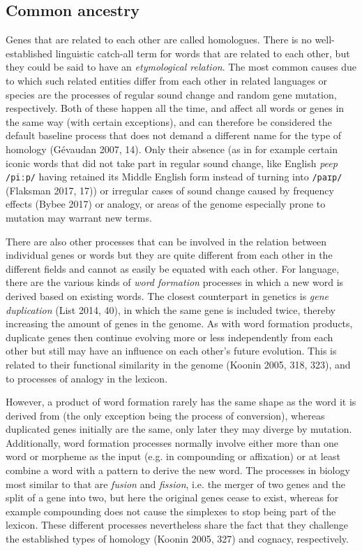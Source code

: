 \documentclass[
  a4paper,
  14pt,
  oneside,
  tablecaptionabove
]{scrbook}
\begin{document}
\subsection*{Common ancestry}

Genes that are related to each other are called homologues. There is no
well-established linguistic catch-all term for words that are related to each
other, but they could be said to have an \emph{etymological relation}. The most
common causes due to which such related entities differ from each other in
related languages or species are the processes of regular sound change and
random gene mutation, respectively. Both of these happen all the time, and
affect all words or genes in the same way (with certain exceptions), and can
therefore be considered the default baseline process that does not demand a
different name for the type of homology (Gévaudan 2007, 14). Only their
absence (as in for example certain iconic words that did not take part in
regular sound change, like English \emph{peep} \texttt{/piːp/} having retained its Middle
English form instead of turning into \texttt{/paɪp/} (Flaksman 2017, 17)) or irregular
cases of sound change caused by frequency effects (Bybee 2017) or analogy,
or areas of the genome especially prone to mutation may warrant new terms.


There are also other processes that can be involved in the relation between
individual genes or words but they are quite different from each other in
the different fields and cannot as easily be equated with each other. For
language, there are the various kinds of \emph{word formation} processes in which
a new word is derived based on existing words. The closest counterpart in
genetics is \emph{gene duplication} (List 2014, 40), in which the same gene is
included twice, thereby increasing the amount of genes in the genome. As with 
word formation products, duplicate genes then continue evolving more or less
independently from each other but still may have an influence on each other’s 
future evolution. This is related to their functional similarity in the genome
(Koonin 2005, 318, 323), and to processes of analogy in the lexicon.


However, a product of word formation rarely has the same shape as the word it
is derived from (the only exception being the process of conversion), 
whereas duplicated genes initially are the same, only later they may diverge 
by mutation. Additionally, word formation processes normally involve either 
more than one word or morpheme as the input (e.g. in compounding or
affixation) or at least combine a word with a pattern to derive the new word. 
The processes in biology most similar to that are \emph{fusion} and \emph{fission}, i.e. 
the merger of two genes and the split of a gene into two, but here the original 
genes cease to exist, whereas for example compounding does not cause the 
simplexes to stop being part of the lexicon. These different processes 
nevertheless share the fact that they challenge the established types of 
homology (Koonin 2005, 327) and cognacy, respectively.
\end{document}
